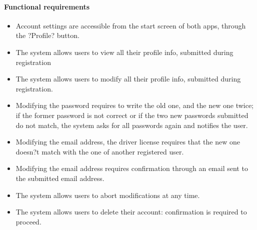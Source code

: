 \paragraph{Functional requirements }
\begin{itemize}
	\item Account settings are accessible from the start screen of both apps, through the ?Profile? button.
	\item The system allows users to view all their profile info, submitted during registration
	\item The system allows users to modify all their profile info, submitted during registration.
	\item Modifying the password requires to write the old one, and the new one twice; if the former password is not correct or if the two new passwords submitted do not match, the system asks for all passwords again and notifies the user.
	\item Modifying the email address, the driver license requires that the new one doesn?t match with the one of another registered user.
	\item Modifying the email address requires confirmation through an email sent to the submitted email address.
	\item The system allows users to abort modifications at any time.
	\item The system allows users to delete their account: confirmation is required to proceed.
\end{itemize}
